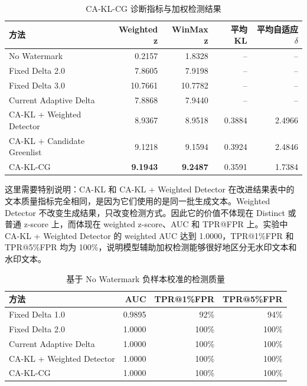 \documentclass[12pt,a4paper,UTF8]{ctexart}
\newcommand{\method}{CA-KL}
\newcommand{\fullmethod}{CA-KL-CG}
\begin{document}
\begin{table}[H]
    \centering
    \caption{CA-KL-CG 诊断指标与加权检测结果}
    \label{tab:weighted}
    \small
    \begin{tabularx}{\textwidth}{p{}rrrr}
        \toprule
        方法 & Weighted z & WinMax z & 平均 KL & 平均自适应 $\delta$ \\
        \midrule
        No Watermark & 0.2157 & 1.8328 & -- & -- \\
        Fixed Delta 2.0 & 7.8605 & 7.9198 & -- & -- \\
        Fixed Delta 3.0 & 10.7661 & 10.7782 & -- & -- \\
        Current Adaptive Delta & 7.8868 & 7.9440 & -- & -- \\
        \method{} + Weighted Detector & 8.9367 & 8.9518 & 0.3884 & 2.4966 \\
        CA-KL + Candidate Greenlist & 9.1218 & 9.1594 & 0.3924 & 2.4846 \\
        \fullmethod{} & \textbf{9.1943} & \textbf{9.2487} & 0.3591 & 1.7384 \\
        \bottomrule
    \end{tabularx}
\end{table}

这里需要特别说明：\method{} 和 \method{} + Weighted Detector 在改进结果表中的文本质量指标完全相同，是因为它们使用的是同一批生成文本。Weighted Detector 不改变生成结果，只改变检测方式。因此它的价值不体现在 Distinct 或普通 z-score 上，而体现在 weighted z-score、AUC 和 TPR@FPR 上。实验中 \method{} + Weighted Detector 的 weighted AUC 达到 1.0000，TPR@1\%FPR 和 TPR@5\%FPR 均为 100\%，说明模型辅助加权检测能够很好地区分无水印文本和水印文本。

\begin{table}[H]
    \centering
    \caption{基于 No Watermark 负样本校准的检测质量}
    \label{tab:auc}
    \small
    \begin{tabularx}{\textwidth}{p{}rrr}
        \toprule
        方法 & AUC & TPR@1\%FPR & TPR@5\%FPR \\
        \midrule
        Fixed Delta 1.0 & 0.9895 & 92\% & 94\% \\
        Fixed Delta 2.0 & 1.0000 & 100\% & 100\% \\
        Current Adaptive Delta & 1.0000 & 100\% & 100\% \\
        \method{} + Weighted Detector & 1.0000 & 100\% & 100\% \\
        \fullmethod{} & 1.0000 & 100\% & 100\% \\
        \bottomrule
    \end{tabularx}
\end{table}
\end{document}

